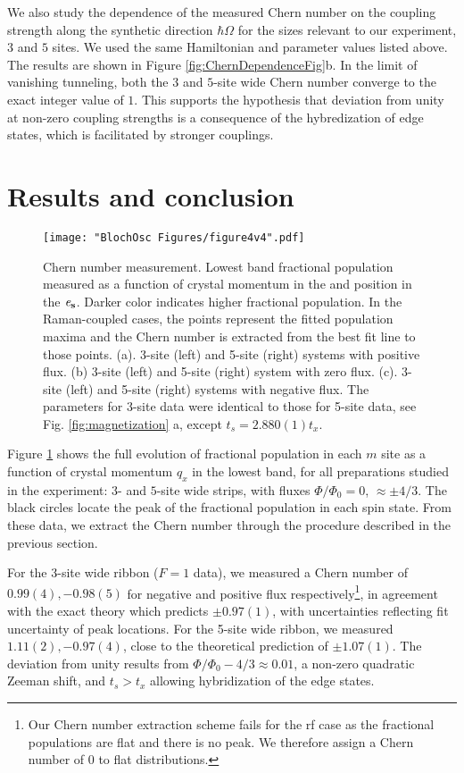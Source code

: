 We also study the dependence of the measured Chern number on the coupling strength along the synthetic direction $\hbar\Omega$ for the sizes relevant to our experiment, $3$ and $5$ sites. We used the same Hamiltonian and parameter values listed above. The results are shown in  Figure \ref{fig:ChernDependenceFig}b. In the limit of vanishing tunneling, both the $3$ and $5$-site wide Chern number converge to the exact integer value of $1$. This supports the hypothesis that deviation from unity at non-zero coupling strengths is a consequence of the hybredization of edge states, which is facilitated by stronger couplings. 

\section{Results and conclusion}

\begin{figure}
\texttt{[image: "BlochOsc Figures/figure4v4".pdf]}
\caption[Chern number measurement] {Chern number measurement. Lowest band fractional population measured as a function of crystal momentum in the  \ex  and position in the $\bf{\mathit{e}_s}$. Darker color indicates higher fractional population. In the Raman-coupled cases, the points represent the fitted population maxima and the Chern number is extracted from the best fit line to those points.  (a). 3-site (left) and 5-site (right) systems with positive flux.  (b) 3-site (left) and 5-site (right) system with zero flux.  (c). 3-site (left) and 5-site (right) systems with negative flux. The parameters for 3-site data were identical to those for 5-site data, see Fig. \ref{fig:magnetization} a, except $t_s =2.880(1)t_x$.}
\label{fig:finalData}
\end{figure}

Figure \ref{fig:finalData} shows the full evolution of fractional population in each $m$ site as a function of crystal momentum $q_x$ in the lowest band, for all preparations studied in the experiment: $3$- and $5$-site wide strips, with fluxes $\Phi/\Phi_0 = 0$, $\approx\pm 4/3$.   The black circles locate the peak of the fractional population in each spin state. From these data, we extract the Chern number through the procedure described in the previous section.

 For the 3-site wide ribbon ($F=1$ data), we measured a Chern number of $0.99(4), -0.98(5)$ for negative and positive flux respectively\footnote{Our Chern number extraction scheme fails for the rf case as the fractional populations are flat and there is no peak. We therefore assign a Chern number of $0$ to flat distributions.}, in agreement with the exact theory which predicts $\pm0.97(1)$, with uncertainties reflecting fit uncertainty of peak locations.  For the 5-site wide ribbon,  we measured $1.11(2), -0.97(4)$, close to the theoretical prediction of $\pm 1.07(1)$. The deviation from unity results from $\Phi/\Phi_0-4/3\approx0.01$, a non-zero quadratic Zeeman shift, and $t_s>t_x$ allowing hybridization of the edge states\cite{Mugel2017}.

